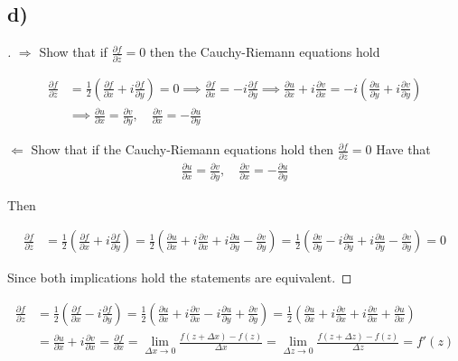 \documentclass{article}
\begin{document}
  \subsection*{d)}
  \begin{proof}[\unskip\nopunct]
    $\pmb{\Rightarrow}$ Show that if $\frac{\partial f}{\partial \overline{z}} = 0$ then the Cauchy-Riemann equations hold


    \begin{align*}\frac{\partial f}{\partial \overline{z}} &= \frac{1}{2}\left(\frac{\partial f}{\partial x} + i\frac{\partial f}{\partial y}\right) = 0 \implies \frac{\partial f}{\partial x} = -i\frac{\partial f}{\partial y} \implies \frac{\partial u }{\partial x} + i \frac{\partial v }{\partial x} = -i\left(\frac{\partial u }{\partial y} + i\frac{\partial v }{\partial y}\right)\\
      &\implies \frac{\partial u }{\partial x} = \frac{\partial v}{\partial y}, \quad \frac{\partial v }{\partial x} = - \frac{\partial u }{\partial y}
    \end{align*}


    $\pmb{\Leftarrow}$ Show that if the Cauchy-Riemann equations hold then $\frac{\partial f}{\partial \overline{z}} = 0$
    Have that
    \begin{align*}
      \frac{\partial u }{\partial x} = \frac{\partial v}{\partial y}, \quad \frac{\partial v }{\partial x} = - \frac{\partial u }{\partial y}
    \end{align*}

    Then

    \begin{align*}
      \frac{\partial f}{\partial \overline{z}} &= \frac{1}{2}\left(\frac{\partial f}{\partial x} + i\frac{\partial f}{\partial y}\right) = \frac{1}{2}\left(\frac{\partial u}{\partial x} +  i\frac{\partial v}{\partial x} + i\frac{\partial u}{\partial y} - \frac{\partial v}{\partial y}\right) = \frac{1}{2}\left(\frac{\partial v}{\partial y} -  i\frac{\partial u}{\partial y} + i\frac{\partial u}{\partial y} - \frac{\partial v}{\partial y}\right) = 0
    \end{align*}


    Since both implications hold the statements are equivalent.

  \end{proof}
  
\begin{align*}\frac{\partial f}{\partial z} &= \frac{1}{2}\left(\frac{\partial f}{\partial x} - i\frac{\partial f}{\partial y}\right) = \frac{1}{2}\left(\frac{\partial u}{\partial x} +i\frac{\partial v}{\partial x}- i\frac{\partial u}{\partial y} + \frac{\partial v}{\partial y}\right)  = \frac{1}{2}\left(\frac{\partial u}{\partial x} + i\frac{\partial v}{\partial x} +  i\frac{\partial v}{\partial x} + \frac{\partial u}{\partial x}\right)  \\
  &=\frac{\partial u}{\partial x} + i\frac{\partial v}{\partial x} = \frac{\partial f}{\partial x} = \lim_{\Delta x \to 0} \frac{f(z + \Delta x) - f(z)}{\Delta x} = \lim_{\Delta z \to 0}\frac{f(z + \Delta z) - f(z)}{\Delta z} = f'(z) 
\end{align*}
\end{document}
